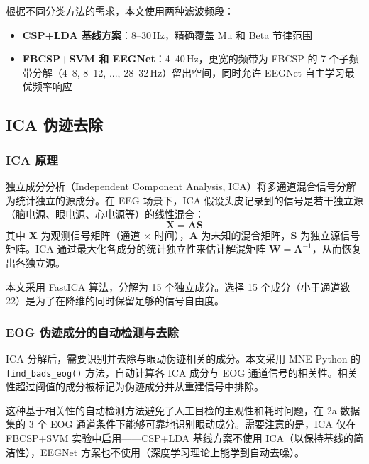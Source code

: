 根据不同分类方法的需求，本文使用两种滤波频段：

\begin{itemize}[leftmargin=2em]
	\item \textbf{CSP+LDA 基线方案}：8--30\,Hz，精确覆盖 Mu 和 Beta 节律范围
	\item \textbf{FBCSP+SVM 和 EEGNet}：4--40\,Hz，更宽的频带为 FBCSP 的 7 个子频带分解（4--8, 8--12, ..., 28--32\,Hz）留出空间，同时允许 EEGNet 自主学习最优频率响应
\end{itemize}

\subsection{ICA 伪迹去除}
\label{sec:ica-preproc}

\subsubsection{ICA 原理}

独立成分分析（Independent Component Analysis, ICA）将多通道混合信号分解为统计独立的源成分。在 EEG 场景下，ICA 假设头皮记录到的信号是若干独立源（脑电源、眼电源、心电源等）的线性混合：
\begin{equation}\label{eq:ica}
\mathbf{X} = \mathbf{A} \mathbf{S}
\end{equation}
其中 $\mathbf{X}$ 为观测信号矩阵（通道 $\times$ 时间），$\mathbf{A}$ 为未知的混合矩阵，$\mathbf{S}$ 为独立源信号矩阵。ICA 通过最大化各成分的统计独立性来估计解混矩阵 $\mathbf{W} = \mathbf{A}^{-1}$，从而恢复出各独立源。

本文采用 FastICA 算法，分解为 15 个独立成分。选择 15 个成分（小于通道数 22）是为了在降维的同时保留足够的信号自由度。

\subsubsection{EOG 伪迹成分的自动检测与去除}

ICA 分解后，需要识别并去除与眼动伪迹相关的成分。本文采用 MNE-Python 的 \texttt{find\_bads\_eog()} 方法，自动计算各 ICA 成分与 EOG 通道信号的相关性。相关性超过阈值的成分被标记为伪迹成分并从重建信号中排除。

这种基于相关性的自动检测方法避免了人工目检的主观性和耗时问题，在 2a 数据集的 3 个 EOG 通道条件下能够可靠地识别眼动成分。需要注意的是，ICA 仅在 FBCSP+SVM 实验中启用——CSP+LDA 基线方案不使用 ICA（以保持基线的简洁性），EEGNet 方案也不使用（深度学习理论上能学到自动去噪）。

